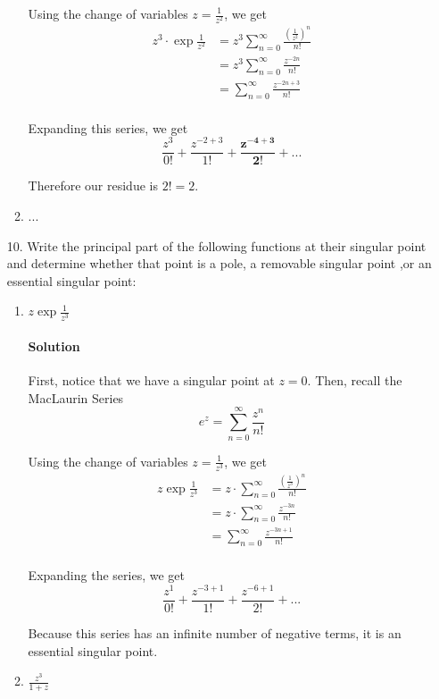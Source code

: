 \documentclass[11pt]{article}
\begin{document}
\begin{enumerate}
\begin{enumerate}
			Using the change of variables $z = \frac{1}{z^2}$, we get
			\[\begin{aligned}
			z^3 \cdot \exp{\frac{1}{z^2}}
			&= z^3 \sum^{\infty}_{n=0} \frac{(\frac{1}{z^2})^n
				}{n!} \\
			&= z^3 \sum^{\infty}_{n=0} \frac{z^{-2n}}{n!} \\
			&= \sum^{\infty}_{n=0} \frac{z^{-2n + 3}}{n!} \\
			\end{aligned}\]
			
			Expanding this series, we get
			\[\frac{z^3}{0!} + \frac{z^{-2 + 3}}{1!} + \mathbf{\frac{z^{-4+3}}{2!}} + ...
			\]
			
			Therefore our residue is $2! = 2$.
			
			\item ...
		\end{enumerate}
	
	\item[10.] Write the principal part of the following functions at their singular point and determine whether that point is a pole, a removable singular point ,or an essential singular point:
	
	\begin{enumerate}
		\item $z \exp{\frac{1}{z^3}} $
		
		\paragraph{Solution} First, notice that we have a singular point at $z = 0$. Then, recall the MacLaurin Series
		\[e^z = \sum^{\infty}_{n=0} \frac{z^n}{n!} \]		
		
		Using the change of variables $z = \frac{1}{z^3}$, we get
		\[\begin{aligned}
		z \exp{\frac{1}{z^3}}
		&= z \cdot \sum^{\infty}_{n=0} \frac{( \frac{1}{z^3} )^n}{n!} \\
		&= z \cdot \sum^{\infty}_{n=0} \frac{z^{-3n}}{n!} \\
		&= \sum^{\infty}_{n=0} \frac{z^{-3n + 1}}{n!} \\
		\end{aligned}\]
		
		Expanding the series, we get
		\[\frac{z^1}{0!} + \frac{z^{-3 + 1}}{1!} + \frac{z^{-6 + 1}}{2!} + ... \]
		
		Because this series has an infinite number of negative terms, it is an essential singular point.
				
		\item $\frac{z^3}{1 + z} $
		

\end{enumerate}
\end{enumerate}
\end{document}
